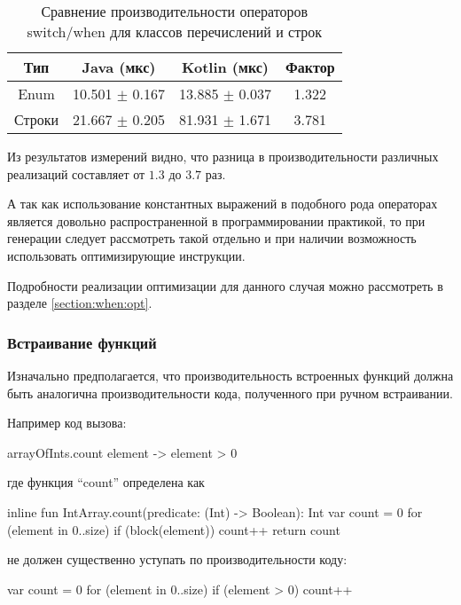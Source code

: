 \begin{table}[h]
\begin{center}
\begin{tabular}{|c|c|c|c|} \hline
Тип & Java (мкс) & Kotlin (мкс) & Фактор \\ \hline
Enum & 10.501 $\pm$ 0.167 & 13.885 $\pm$ 0.037 & 1.322\\ \hline
Строки & 21.667 $\pm$ 0.205 & 81.931 $\pm$ 1.671 & 3.781\\ \hline
\end{tabular}
\caption{Сравнение производительности операторов switch/when для классов перечислений и строк}
\end{center}
\end{table}

Из результатов измерений видно, что разница в производительности различных реализаций
составляет от $1.3$ до $3.7$ раз.

А так как использование константных выражений в подобного рода операторах является довольно
распространенной в программировании практикой, то при генерации следует рассмотреть такой
отдельно и при наличии возможность использовать оптимизирующие инструкции.

Подробности реализации оптимизации для данного случая можно рассмотреть в разделе \ref{section:when:opt}.

\subsubsection{Встраивание функций}
\label{section:inline:bm}
Изначально предполагается, что производительность встроенных функций должна быть аналогична
производительности кода, полученного при ручном встраивании.

Например код вызова:
\begin{pyglist}[language=kotlin]
    arrayOfInts.count { element -> element > 0 }
\end{pyglist}

где функция ``count'' определена как
\begin{pyglist}[language=kotlin]
    inline fun IntArray.count(predicate: (Int) -> Boolean): Int {
        var count = 0
        for (element in 0..size) {
            if (block(element)) {
                count++
            }
        }
        return count
    }
\end{pyglist}
не должен существенно уступать по производительности коду:
\begin{pyglist}[language=kotlin]
        var count = 0
        for (element in 0..size) {
            if (element > 0) {
                count++
            }
        }
\end{pyglist}

